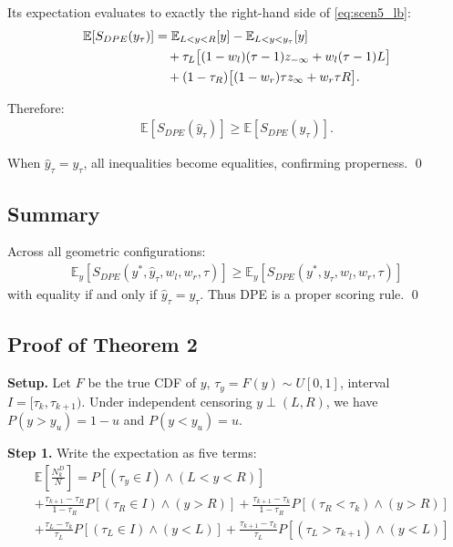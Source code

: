\documentclass[sigconf]{acmart}
\begin{document}
Its expectation evaluates to exactly the right-hand side of \eqref{eq:scen5_lb}:
\begin{align*}
\mathbb{E}[S_{DPE}(y_\tau)] &= \mathbb{E}_{L<y<R}[y] - \mathbb{E}_{L<y<y_\tau}[y] \notag\\
&\quad + \tau_L\bigl[(1-w_l)(\tau-1)z_{-\infty} + w_l(\tau-1)L\bigr] \notag\\
&\quad + (1-\tau_R)\bigl[(1-w_r)\tau z_{\infty} + w_r\tau R\bigr].
\end{align*}

Therefore:
\begin{align*}
\mathbb{E}[S_{DPE}(\hat{y}_\tau)] \ge \mathbb{E}[S_{DPE}(y_\tau)].
\end{align*}

When $\hat{y}_\tau = y_\tau$, all inequalities become equalities, confirming properness. \qed

\subsection{Summary}

Across all geometric configurations:
\begin{align}
\mathbb{E}_y[S_{DPE}(y^*, \hat{y}_\tau, w_l, w_r, \tau)] \ge \mathbb{E}_y[S_{DPE}(y^*, y_\tau, w_l, w_r, \tau)]
\end{align}
with equality if and only if $\hat{y}_\tau = y_\tau$. Thus DPE is a proper scoring rule. \qed

\subsection{Proof of Theorem 2}


\textbf{Setup.} Let $F$ be the true CDF of $y$, $\tau_y = F(y) \sim U[0,1]$, interval $I = [\tau_k, \tau_{k+1})$.
Under independent censoring $y \perp (L,R)$, we have $P(y > y_u) = 1-u$ and $P(y < y_u) = u$.

\textbf{Step 1.} Write the expectation as five terms:
\begin{align*}
& \mathbb{E}\left[\frac{N_k^D}{N}\right] = P[(\tau_y \in I) \wedge (L < y < R)] \\
&+ \tfrac{\tau_{k+1}-\tau_R}{1-\tau_R} P[(\tau_R \in I) \wedge (y > R)] + \tfrac{\tau_{k+1}-\tau_k}{1-\tau_R} P[(\tau_R < \tau_k) \wedge (y > R)] \\
&+ \tfrac{\tau_L-\tau_k}{\tau_L} P[(\tau_L \in I) \wedge (y < L)] + \tfrac{\tau_{k+1}-\tau_k}{\tau_L} P[(\tau_L > \tau_{k+1}) \wedge (y < L)]
\end{align*}
\end{document}
